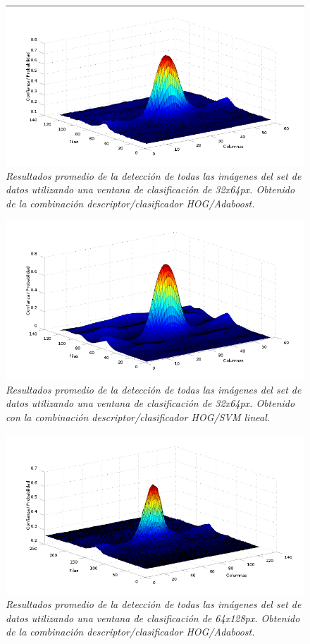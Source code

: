 \begin{figure}[H]
  \centering
  \includegraphics[scale=.6]{images/mean/boost/32}
  \caption{\em  Resultados promedio de la detección de todas las imágenes del set de datos utilizando una ventana de clasificación de 32x64px. Obtenido de la combinación descriptor/clasificador HOG/Adaboost.}  
  \label{fig:gp1}
\end{figure}

\begin{figure}[H]
  \centering
  \includegraphics[scale=.6]{images/mean/svm/32}
  \caption{\em  Resultados promedio de la detección de todas las imágenes del set de datos utilizando una ventana de clasificación de 32x64px. Obtenido con la combinación descriptor/clasificador HOG/SVM lineal.}  
  \label{fig:gp2}
\end{figure}

\begin{figure}[H]
  \centering
  \includegraphics[scale=.6]{images/mean/boost/64}
  \caption{\em  Resultados promedio de la detección de todas las imágenes del set de datos utilizando una ventana de clasificación de 64x128px. Obtenido de la combinación descriptor/clasificador HOG/Adaboost.}  
  \label{fig:gp3}
\end{figure}

